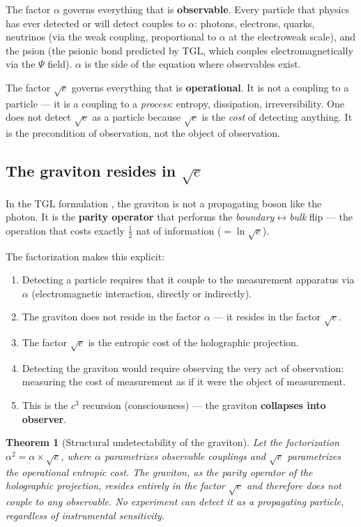 \documentclass[12pt,a4paper,twoside]{article}
\newtheorem{theorem}{Theorem}[section]
\newcommand{\alphaii}{\alpha^{2}}
\newcommand{\Psifield}{\Psi}
\newcommand{\boundary}{\textit{boundary}}
\newcommand{\bulk}{\textit{bulk}}
\begin{document}
The factor $\alpha$ governs everything that is \textbf{observable}. Every particle that physics has ever detected or will detect couples to $\alpha$: photons, electrons, quarks, neutrinos (via the weak coupling, proportional to $\alpha$ at the electroweak scale), and the psion (the psionic bond predicted by TGL, which couples electromagnetically via the $\Psifield$ field). $\alpha$ is the side of the equation where observables exist.

The factor $\sqrt{e}$ governs everything that is \textbf{operational}. It is not a coupling to a particle --- it is a coupling to a \textit{process}: entropy, dissipation, irreversibility. One does not detect $\sqrt{e}$ as a particle because $\sqrt{e}$ is the \textit{cost} of detecting anything. It is the precondition of observation, not the object of observation.

\subsection{The graviton resides in $\sqrt{e}$}

In the TGL formulation \cite{Miguel2026Fronteira}, the graviton is not a propagating boson like the photon. It is the \textbf{parity operator} that performs the \boundary$\leftrightarrow$\bulk{} flip --- the operation that costs exactly $\frac{1}{2}$ nat of information ($= \ln\sqrt{e}$).

The factorization makes this explicit:

\begin{enumerate}[nosep]
\item Detecting a particle requires that it couple to the measurement apparatus via $\alpha$ (electromagnetic interaction, directly or indirectly).
\item The graviton does not reside in the factor $\alpha$ --- it resides in the factor $\sqrt{e}$.
\item The factor $\sqrt{e}$ is the entropic cost of the holographic projection.
\item Detecting the graviton would require observing the very act of observation: measuring the cost of measurement as if it were the object of measurement.
\item This is the $c^3$ recursion (consciousness) --- the graviton \textbf{collapses into observer}.
\end{enumerate}

\begin{theorem}[Structural undetectability of the graviton]
\label{thm:graviton}
Let the factorization $\alphaii = \alpha \times \sqrt{e}$, where $\alpha$ parametrizes observable couplings and $\sqrt{e}$ parametrizes the operational entropic cost. The graviton, as the parity operator of the holographic projection, resides entirely in the factor $\sqrt{e}$ and therefore does not couple to any observable. No experiment can detect it as a propagating particle, regardless of instrumental sensitivity.
\end{theorem}
\end{document}
